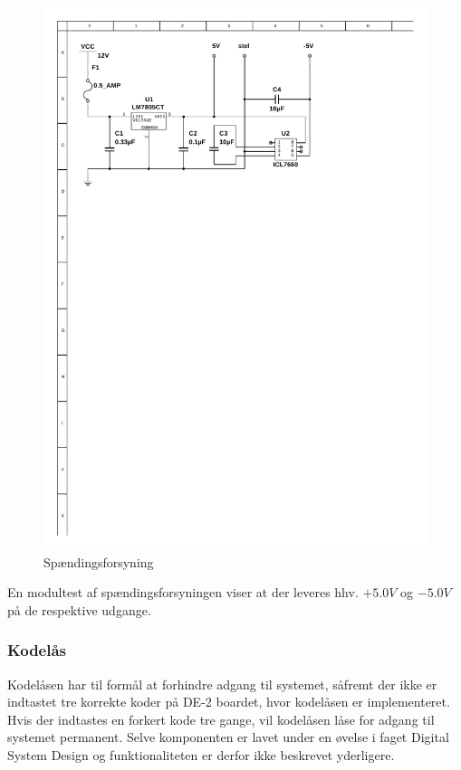 \begin{figure}[h]
	\centering
	\includegraphics[scale=1,trim=50 555 150 50, clip=true]{../Projektdokumentation/HardwareDesign/Diagrammer/Stroemforsyning.pdf}
	\caption{Spændingsforsyning}
	\label{fig:Stromforsyning}
\end{figure}

En modultest af spændingsforsyningen viser at der leveres hhv. $+5.0V$ og $-5.0V$ på de respektive udgange.

\subsubsection{Kodelås}
Kodelåsen har til formål at forhindre adgang til systemet, såfremt der ikke er indtastet tre korrekte koder på DE-2 boardet, hvor kodelåsen er implementeret. Hvis der indtastes en forkert kode tre gange, vil kodelåsen låse for adgang til systemet permanent. Selve komponenten er lavet under en øvelse i faget Digital System Design og funktionaliteten er derfor ikke beskrevet yderligere.\\

